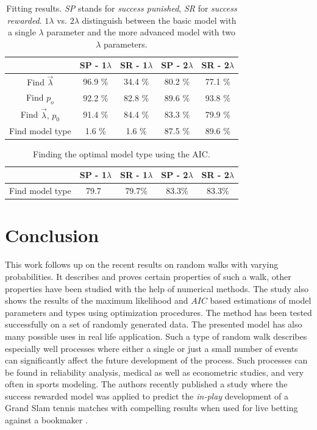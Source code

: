 \documentclass{amsart}
\theoremstyle{definition}
\theoremstyle{plain}
\theoremstyle{plain}
\theoremstyle{plain}
\numberwithin{equation}{section}
\begin{document}
\begin{table}

\begin{centering}
{\caption{\label{tab:Fitting-results}Fitting results. \emph{SP }stands for
\emph{success punished}, \emph{SR} for \emph{success rewarded}. $1\lambda$
vs. $2\lambda$ distinguish between the basic model with a single
$\lambda$ parameter and the more advanced model with two $\lambda$ parameters.}}
\begin{tabular}{|c|c|c|c|c|}
\hline


 & SP - 1$\lambda$ & SR - 1$\lambda$ & SP - 2$\lambda$ & SR - 2$\lambda$\tabularnewline
\hline
\hline
Find $\overrightarrow{\lambda}$ & 96.9 \% & 34.4 \% & 80.2 \% & 77.1 \%\tabularnewline
\hline
Find $p_{o}$ & 92.2 \% & 82.8 \% & 89.6 \% & 93.8 \%\tabularnewline
\hline
Find $\overrightarrow{\lambda},\,p_{0}$ & 91.4 \% & 84.4 \% & 83.3 \% & 79.9 \%\tabularnewline
\hline
Find model type & 1.6 \% & 1.6 \% & 87.5 \% & 89.6 \%\tabularnewline
\hline
\end{tabular}
\par\end{centering}
\end{table}

\begin{table}
\centering{}%

{\caption{\label{tab:Fitting-results-Akaike}Finding the optimal model type
using the AIC.}
\begin{tabular}{|c|c|c|c|c|}
\hline
 & SP - 1$\lambda$ & SR - 1$\lambda$ & SP - 2$\lambda$ & SR - 2$\lambda$\tabularnewline
\hline
\hline
Find model type &
79.7\
 &
79.7\%
 &
83.3\%
 &
83.3\%
\tabularnewline
\hline
\end{tabular}

}
\end{table}

\section{Conclusion\label{sec:Conclusion}}

This work follows up on the recent results on random walks with varying
probabilities. It describes and proves certain properties of such
a walk, other properties have been studied with the help of numerical
methods. The study also shows the results of the maximum likelihood
and $AIC$ based estimations of model parameters and types using optimization
procedures. The method has been tested successfully on a set of randomly
generated data. The presented model has also many possible uses in
real life application. Such a type of random walk describes especially
well processes where either a single or just a small number of events
can significantly affect the future development of the process. Such
processes can be found in reliability analysis, medical as well as
econometric studies, and very often in sports modeling. The authors
recently published a study where the success rewarded model was applied
to predict the \emph{in-play} development of a Grand Slam tennis matches
with compelling results when used for live betting against a bookmaker
\cite{ja2019imam}.
\end{document}
